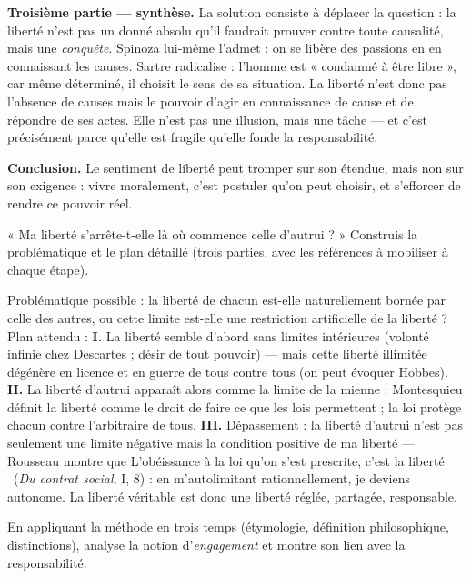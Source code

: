 \documentclass[11pt]{article}
\begin{document}
\begin{exoresolu}
\textbf{Troisième partie — synthèse.} La solution consiste à déplacer la question : la liberté n'est pas un donné absolu qu'il faudrait prouver contre toute causalité, mais une \emph{conquête}. Spinoza lui-même l'admet : on se libère des passions en en connaissant les causes. Sartre radicalise : l'homme est « condamné à être libre », car même déterminé, il choisit le sens de sa situation. La liberté n'est donc pas l'absence de causes mais le pouvoir d'agir en connaissance de cause et de répondre de ses actes. Elle n'est pas une illusion, mais une tâche — et c'est précisément parce qu'elle est fragile qu'elle fonde la responsabilité.

\textbf{Conclusion.} Le sentiment de liberté peut tromper sur son étendue, mais non sur son exigence : vivre moralement, c'est postuler qu'on peut choisir, et s'efforcer de rendre ce pouvoir réel.
\end{exoresolu}

\begin{exercice}
« Ma liberté s'arrête-t-elle là où commence celle d'autrui ? » Construis la problématique et le plan détaillé (trois parties, avec les références à mobiliser à chaque étape).
\end{exercice}

\begin{corrige}[Exercice 1]
Problématique possible : la liberté de chacun est-elle naturellement bornée par celle des autres, ou cette limite est-elle une restriction artificielle de la liberté ? Plan attendu : \textbf{I.} La liberté semble d'abord sans limites intérieures (volonté infinie chez Descartes ; désir de tout pouvoir) — mais cette liberté illimitée dégénère en licence et en guerre de tous contre tous (on peut évoquer Hobbes). \textbf{II.} La liberté d'autrui apparaît alors comme la limite de la mienne : Montesquieu définit la liberté comme le droit de faire ce que les lois permettent ; la loi protège chacun contre l'arbitraire de tous. \textbf{III.} Dépassement : la liberté d'autrui n'est pas seulement une limite négative mais la condition positive de ma liberté — Rousseau montre que \guillemotleft L'obéissance à la loi qu'on s'est prescrite, c'est la liberté \guillemotright\ (\emph{Du contrat social}, I, 8) : en m'autolimitant rationnellement, je deviens autonome. La liberté véritable est donc une liberté réglée, partagée, responsable.
\end{corrige}

\begin{exercice}
En appliquant la méthode en trois temps (étymologie, définition philosophique, distinctions), analyse la notion d'\emph{engagement} et montre son lien avec la responsabilité.
\end{exercice}
\end{document}
